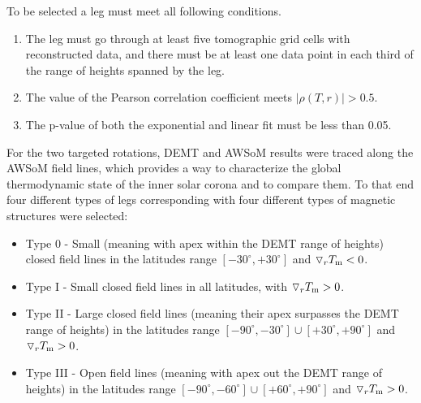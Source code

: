 \documentclass[namedreferences]{solarphysics}
\newcommand{\mdeg}{^\circ}
\newcommand{\dr}{\triangledown_r}
\newcommand{\Tm}{T_{\rm m}}
\newcommand{\rhoTr}{\rho(T,r)}
\def\temp#1{\textcolor{gray}{#1}}
\begin{document}
\begin{article}
{To be selected a leg must meet all following conditions.}

\begin{enumerate}

\item 
The leg must go through at least five tomographic grid cells with reconstructed data, and there must be at least one data point in each third of the range of heights spanned by the leg.

\item 
The {value of the Pearson correlation coefficient meets $|\rhoTr| > 0.5$.}

\item 
The p-value of both the exponential and linear fit must be less than 0.05.

\end{enumerate}


For the two targeted rotations, DEMT and AWSoM results were traced along the AWSoM field lines, which provides a way to characterize the global thermodynamic state of the inner solar corona and to compare them. To that end four different types of {legs} corresponding with four different types of magnetic structures were selected:

\begin{itemize}
 \item Type 0 - Small (meaning with apex within the DEMT range of heights) closed field lines in the latitudes range $[-30\mdeg,+30\mdeg]$ and $\dr \Tm < 0$. %

\item  Type I - Small closed field lines in all latitudes, with $\dr \Tm > 0$. %

\item  Type II - Large closed field lines (meaning their apex surpasses the DEMT range of heights) in the latitudes range $[-90\mdeg,-30\mdeg] \cup [+30\mdeg,+90\mdeg]$ and $\dr \Tm > 0$. %

\item Type III - Open field lines (meaning with apex out the DEMT range of heights) in the latitudes range $[-90\mdeg,-60\mdeg] \cup [+60\mdeg,+90\mdeg]$ and $\dr \Tm > 0$.


\end{itemize}
\end{article}
\end{document}

